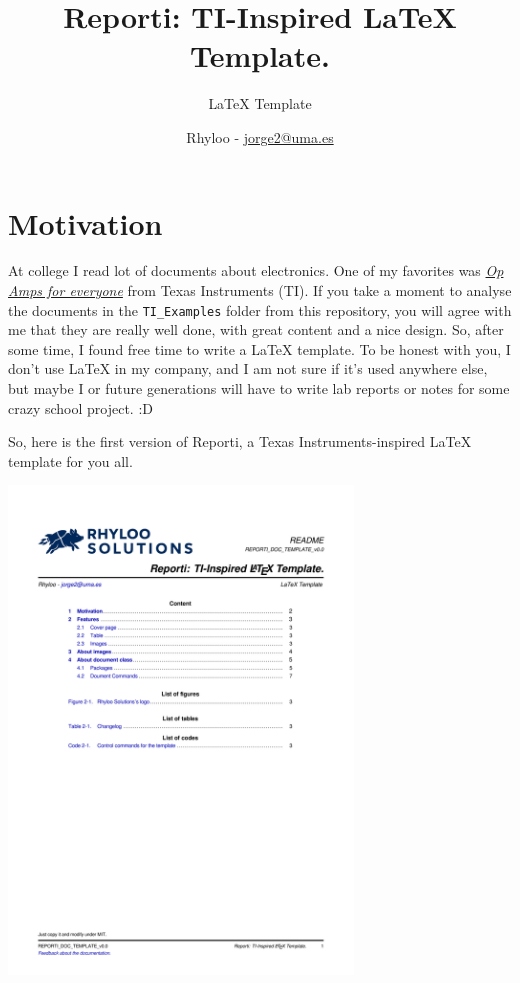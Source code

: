 \documentclass{reporti}
\date{}
\title{Reporti: TI-Inspired \LaTeX{} Template.}
\begin{document}
\subtitle{LaTeX Template}
\author{Rhyloo - \href{mailto:jorge2@uma.es}{jorge2@uma.es}}


\summary{}


\cover[width=1.35\textwidth][continue]



\section{Motivation}
\label{sec:orgdd9db1a}
At college I read lot of documents about electronics. One of my favorites was \emph{\href{https://e2echina.ti.com/cfs-file/\_\_key/telligent-evolution-components-attachments/00-52-01-00-00-04-59-46/OP-amp-for-everyone.pdf}{Op Amps for everyone}} from Texas Instruments (TI). If you take a moment to analyse the documents in the \texttt{TI\_Examples} folder from this repository, you will agree with me that they are really well done, with great content and a nice design. So, after some time, I found free time to write a \LaTeX{} template. To be honest with you, I don't use \LaTeX{} in my company, and I am not sure if it's used anywhere else, but maybe I or future generations will have to write lab reports or notes for some crazy school project. :D

So, here is the first version of Reporti, a Texas Instruments-inspired \LaTeX{} template for you all.

\begin{center}
\includegraphics[fbox,height=35em]{./README.pdf}
\end{center}
\end{document}
